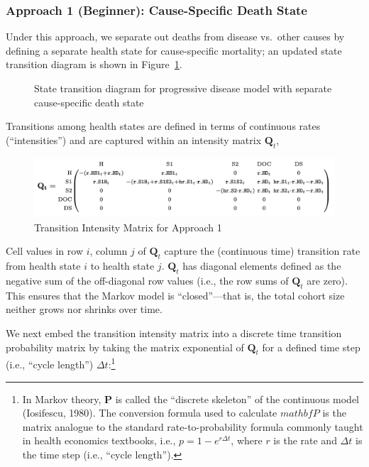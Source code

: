 \documentclass[
]{agujournal2019}
\begin{document}
\subsubsection{Approach 1 (Beginner): Cause-Specific Death
State}\label{approach-1-beginner-cause-specific-death-state}

Under this approach, we separate out deaths from disease vs.~other
causes by defining a separate health state for cause-specific mortality;
an updated state transition diagram is shown in
Figure~\ref{fig-modelDS}.

\begin{figure}


\caption{\label{fig-modelDS}State transition diagram for progressive
disease model with separate cause-specific death state}

\end{figure}%

Transitions among health states are defined in terms of continuous rates
(``intensities'') and are captured within an intensity matrix
\(\mathbf{Q}_t\),

\begin{figure}[H]

{\centering \includegraphics{images/Q_model2.png}

}

\caption{Transition Intensity Matrix for Approach 1}

\end{figure}%

Cell values in row \(i\), column \(j\) of \(\mathbf{Q}_t\) capture the
(continuous time) transition rate from health state \(i\) to health
state \(j\). \(\mathbf{Q}_t\) has diagonal elements defined as the
negative sum of the off-diagonal row values (i.e., the row sums of
\(\mathbf{Q}_t\) are zero). This ensures that the Markov model is
``closed''---that is, the total cohort size neither grows nor shrinks
over time.

We next embed the transition intensity matrix into a discrete time
transition probability matrix by taking the matrix exponential of
\(\mathbf{Q}_t\) for a defined time step (i.e., ``cycle length'')
\(\Delta t\):\footnote{In Markov theory, \(\mathbf{P}\) is called the
  ``discrete skeleton'' of the continuous model (Iosifescu, 1980). The
  conversion formula used to calculate \(mathbf{P}\) is the matrix
  analogue to the standard rate-to-probability formula commonly taught
  in health economics textbooks, i.e., \(p = 1 - e^{r\Delta t}\), where
  \(r\) is the rate and \(\Delta t\) is the time step (i.e., ``cycle
  length'').}
\end{document}
